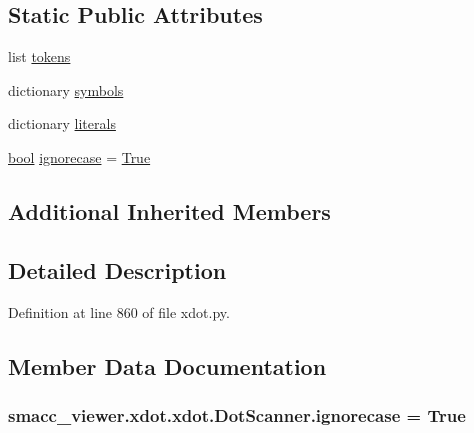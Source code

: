 \subsection*{Static Public Attributes}
\begin{DoxyCompactItemize}
\item 
list \hyperlink{classsmacc__viewer_1_1xdot_1_1xdot_1_1DotScanner_a6419d15f580707951d00dc7cc61d9dc4}{tokens}
\item 
dictionary \hyperlink{classsmacc__viewer_1_1xdot_1_1xdot_1_1DotScanner_ad69a6379ffb9b09158eb563b3c173897}{symbols}
\item 
dictionary \hyperlink{classsmacc__viewer_1_1xdot_1_1xdot_1_1DotScanner_ad0ff606fdffac85a55eb673f273bd9c5}{literals}
\item 
\hyperlink{classbool}{bool} \hyperlink{classsmacc__viewer_1_1xdot_1_1xdot_1_1DotScanner_aa436a90c0d4bd9900bc5a7d8ab3d362e}{ignorecase} = \hyperlink{namespacesmacc__viewer_a48e3092f51d8fc570fcb3d6c76e27f3b}{True}
\end{DoxyCompactItemize}
\subsection*{Additional Inherited Members}


\subsection{Detailed Description}


Definition at line 860 of file xdot.\+py.



\subsection{Member Data Documentation}
\subsubsection[{\texorpdfstring{ignorecase}{ignorecase}}]{ smacc\+\_\+viewer.\+xdot.\+xdot.\+Dot\+Scanner.\+ignorecase = {\bf True}\hspace{0.3cm}{\ttfamily [static]}}\hypertarget{classsmacc__viewer_1_1xdot_1_1xdot_1_1DotScanner_aa436a90c0d4bd9900bc5a7d8ab3d362e}{}\label{classsmacc__viewer_1_1xdot_1_1xdot_1_1DotScanner_aa436a90c0d4bd9900bc5a7d8ab3d362e}


